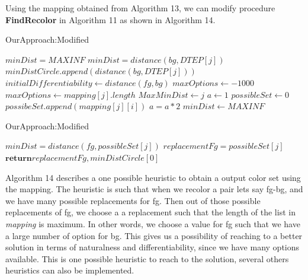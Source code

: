 Using the mapping obtained from Algorithm 13, we can modify procedure \textbf{FindRecolor} in Algorithm 11 as shown in Algorithm 14. 

\begin{algorithm}[!htb]
\caption{OurApproach:Modified}\label{Minimum contrast included}
\begin{algorithmic}[1]
\State $minDist = MAXINF$
		\State $minDist = distance(bg,DTEP[j])$
	\EndIf
\EndFor
{}
		\State $minDistCircle .append(distance(bg,DTEP[j]))$
	\EndIf
\EndFor
\State $initialDifferentiability \gets distance(fg,bg)$
\State $maxOptions \gets -1000$
		  
		\State	$maxOptions \gets mapping[j].length$
		\State	$MaxMinDist \gets j$
		\EndIf
\EndFor
\State $a \gets 1$
\State $possibleSet \gets 0$
			\State $possibeSet.append(mapping[j][i])$
		\EndIf
		\State $a = a*2$
	\EndFor
\EndWhile
\State $minDist \gets MAXINF$
\end{algorithmic}
\end{algorithm}

\begin{algorithm}[!htb]
\caption{OurApproach:Modified}\label{Minimum contrast included}
\begin{algorithmic}[1]
		\State $minDist = distance(fg,possibleSet[j])$
		\State $replacementFg = possibleSet[j]$
	\EndIf
\EndFor
\State $\textbf{return} replacementFg,minDistCircle[0]$
\EndProcedure
\end{algorithmic}
\end{algorithm}

Algorithm 14 describes a one possible heuristic to obtain a output color set using the mapping. The heuristic is such that when we recolor a pair lets say fg-bg, and we have many possible replacements for fg. Then out of those possible replacements of fg, we choose a a replacement such that the length of the list in \textit{mapping} is maximum. In other words, we choose a value for fg such that we have a large number of option for bg. This gives us a possibility of reaching to a better solution in terms of naturalness and differentiability, since we have many options available. This is one possible heuristic to reach to the solution, several others heuristics can also be implemented. 